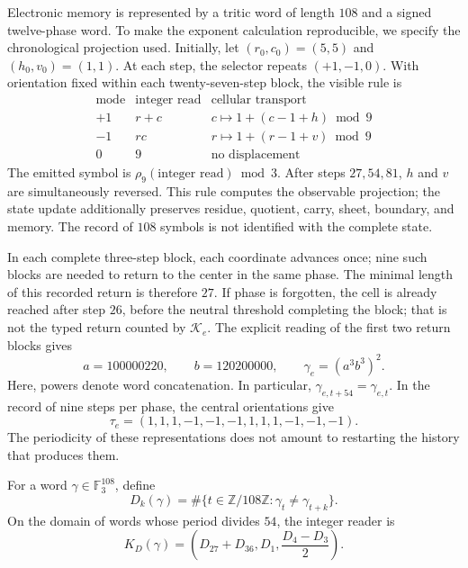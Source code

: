 Electronic memory is represented by a tritic word of length
\(108\) and a signed twelve-phase word. To make the exponent
calculation reproducible, we specify the chronological projection
used. Initially, let
\((r_0,c_0)=(5,5)\) and \((h_0,v_0)=(1,1)\). At each step, the selector
repeats \((+1,-1,0)\). With orientation fixed within each
twenty-seven-step block, the visible rule is
\[
 \begin{array}{c|c|c}
 \text{mode}&\text{integer read}&\text{cellular transport}\\\hline
 +1&r+c&c\mapsto1+(c-1+h)\bmod9\\
 -1&rc&r\mapsto1+(r-1+v)\bmod9\\
 0&9&\text{no displacement}
 \end{array}
\]
The emitted symbol is \(\rho_9(\text{integer read})\bmod3\).
After steps \(27,54,81\), \(h\) and \(v\) are simultaneously
reversed. This rule computes the observable projection; the
state update additionally preserves residue, quotient,
carry, sheet, boundary, and memory. The record of
\(108\) symbols is not identified with the complete state.

In each complete three-step block, each coordinate advances
once; nine such blocks are needed to return to the center in
the same phase. The minimal length of this recorded return is
therefore \(27\). If phase is forgotten, the cell is already reached after
step \(26\), before the neutral threshold completing the block; that is not
the typed return counted by \(\mathcal K_e\). The explicit reading
of the first two return blocks gives
\begin{equation}
 a=100000220,\qquad b=120200000,\qquad
 \gamma_e=(a^3b^3)^2.
 \label{eq:el-palabra}
\end{equation}
Here, powers denote word concatenation. In particular,
\(\gamma_{e,t+54}=\gamma_{e,t}\). In the record of nine steps per
phase, the central orientations give
\begin{equation}
 \tau_e=(1,1,1,-1,-1,-1,1,1,1,-1,-1,-1).
 \label{eq:el-tau}
\end{equation}
The periodicity of these representations does not amount to restarting the
history that produces them.

\begin{definition}
For a word \(\gamma\in\mathbb F_3^{108}\), define
\[
 D_k(\gamma)=\#\{t\in\mathbb Z/108\mathbb Z:
                   \gamma_t\ne\gamma_{t+k}\}.
\]
On the domain of words whose period divides \(54\), the integer
reader is
\begin{equation}
 K_D(\gamma)=\left(D_{27}+D_{36},D_1,\frac{D_4-D_3}{2}\right).
 \label{eq:el-kd}
\end{equation}
\end{definition}

